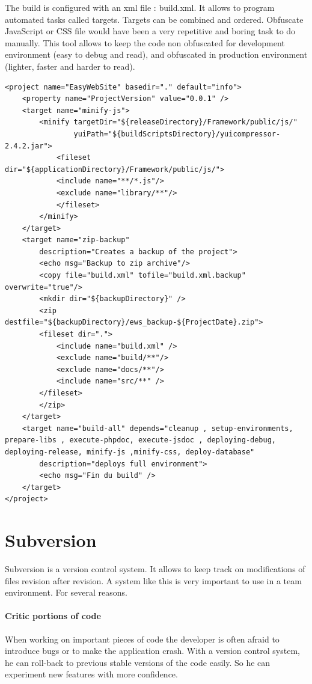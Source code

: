 The build is configured with an xml file : build.xml. It allows to program automated tasks called targets. Targets can be combined and ordered.
Obfuscate JavaScript or CSS file would have been a very repetitive and boring task to do manually. This tool allows to keep the code non obfuscated for development environment (easy to debug and read), and obfuscated in production environment (lighter, faster and harder to read).

\lstset{language=Ant}
\begin{lstlisting}[label=phing-build,caption=Example of Phing build.xml]
<project name="EasyWebSite" basedir="." default="info">
	<property name="ProjectVersion" value="0.0.1" />
	<target name="minify-js">
		<minify targetDir="${releaseDirectory}/Framework/public/js/"
				yuiPath="${buildScriptsDirectory}/yuicompressor-2.4.2.jar">
			<fileset dir="${applicationDirectory}/Framework/public/js/">
			<include name="**/*.js"/>
			<exclude name="library/**"/>
			</fileset>
		</minify>
	</target>	
	<target name="zip-backup"
		description="Creates a backup of the project">
		<echo msg="Backup to zip archive"/>
		<copy file="build.xml" tofile="build.xml.backup" overwrite="true"/>
		<mkdir dir="${backupDirectory}" />				
		<zip destfile="${backupDirectory}/ews_backup-${ProjectDate}.zip">
		<fileset dir=".">
			<include name="build.xml" />
			<exclude name="build/**"/>
			<exclude name="docs/**"/>
			<include name="src/**" />			
		</fileset>
		</zip>
	</target>
	<target name="build-all" depends="cleanup , setup-environments, prepare-libs , execute-phpdoc, execute-jsdoc , deploying-debug, deploying-release, minify-js ,minify-css, deploy-database"
		description="deploys full environment">       
		<echo msg="Fin du build" />		
	</target>		
</project>
\end{lstlisting}

\section{Subversion}

Subversion is a version control system. It allows to keep track on modifications of files revision after revision. A system like this is very important to use in a team environment. For several reasons.

\paragraph*{Critic portions of code}
When working on important pieces of code the developer is often afraid to introduce bugs or to make the application crash. With a version control system, he can roll-back to previous stable versions of the code easily. So he can experiment new features with more confidence. 

